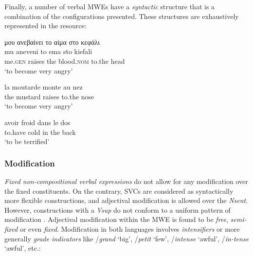 \documentclass[output=paper]{langsci/langscibook}
\begin{document}
Finally, a number of verbal MWEs have a \textit{syntactic}
structure that is a combination of the configurations presented.
These structures are exhaustively represented in the resource:

\begin{exe}
\ex \label{ex:3:22}
\glll  μου ανεβαίνει το αίμα στο κεφάλι \\
mu aneveni to ema sto kiefali\\
me.\textsc{gen} raises the blood.\textsc{nom} to.the head\\
\glt %
‘to become very angry’
\end{exe}

\begin{exe}
\ex \label{ex:3:23}
\gll  la moutarde monte au nez \\
the mustard raises to.the nose\\
\glt ‘to become very angry’
\end{exe}

\begin{exe}
\ex \label{ex:3:24}
\gll  avoir froid dans le dos\\
to.have cold in the back\\
\glt ‘to be terrified’
\end{exe}


\subsubsection{Modification}
\label{section522}

\textit{Fixed non-compositional verbal expressions} do not
allow for any modification over the fixed constituents. 
On the
contrary, SVCs are considered as syntactically more flexible
constructions, and adjectival modification is allowed over the
\textit{Nsent}. However, constructions with a \textit{Vsup} do not
conform to a uniform pattern of modification \citep{moustaki2008}. 
Adjectival modification within the MWE is found to be
\textit{free}, \textit{semi-fixed} or even
\textit{fixed}. Modification in both languages involves
\textit{intensifiers} or \textendash{} more generally \textendash{}
\textit{grade indicators}  like 
/\textit{grand} ‘big’, 
/\textit{petit} ‘few’,
/\textit{intense }‘awful’,
/\textit{in-tense }‘awful’, etc.:
\end{document}
